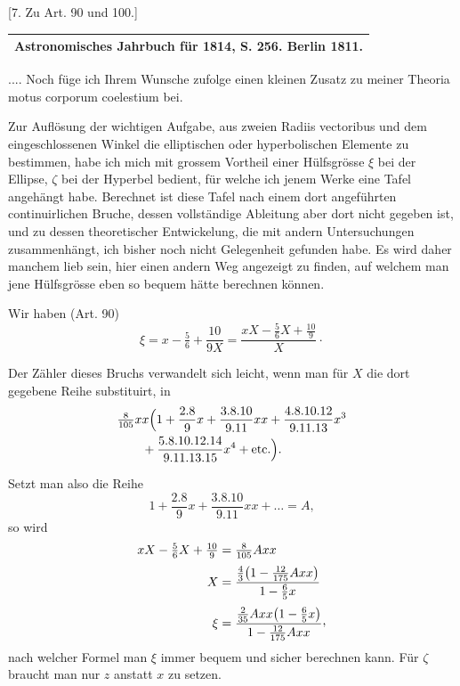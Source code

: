\begin{center}
[7. Zu Art. 90 und 100.]
\end{center}
\begin{center}
\begin{tabular}{c}\hline
\small Astronomisches Jahrbuch für 1814, S. 256. Berlin 1811.\\\hline
\end{tabular}
\end{center}
.... Noch füge ich Ihrem Wunsche zufolge einen kleinen Zusatz zu meiner Theoria motus corporum coelestium bei.

Zur Auflösung der wichtigen Aufgabe, aus zweien Radiis vectoribus und dem eingeschlossenen Winkel die elliptischen oder hyperbolischen Elemente zu bestimmen, habe ich mich mit grossem Vortheil einer Hülfsgrösse \(\xi\) bei der Ellipse, \(\zeta\) bei der Hyperbel bedient, für welche ich jenem Werke eine Tafel angehängt habe. Berechnet ist diese Tafel nach einem dort angeführten continuirlichen Bruche, dessen vollständige Ableitung aber dort nicht gegeben ist, und zu dessen theoretischer Entwickelung, die mit andern Untersuchungen zusammenhängt, ich bisher noch nicht Gelegenheit gefunden habe. Es wird daher manchem lieb sein, hier einen andern Weg angezeigt zu finden, auf welchem man jene Hülfsgrösse eben so bequem hätte berechnen können.

Wir haben (Art. 90)
\[
\xi=x-\tfrac56+\frac{10}{9X}=\frac{xX-\tfrac56X+\tfrac{10}{9}}{X}\mathpunct{\cdot}
\]

Der Zähler dieses Bruchs verwandelt sich leicht, wenn man für \(X\) die dort gegebene Reihe substituirt, in
\[
\begin{aligned}
&\tfrac8{105}xx\Bigl(1+\frac{2.8}{9}x+\frac{3.8.10}{9.11}xx+\frac{4.8.10.12}{9.11.13}x^3\\
&\qquad+\frac{5.8.10.12.14}{9.11.13.15}x^4+\text{etc.}\Bigr).
\end{aligned}
\]

Setzt man also die Reihe
\[
1+\frac{2.8}{9}x+\frac{3.8.10}{9.11}xx+\ldots=A,
\]
so wird
\[
\begin{aligned}
xX-\tfrac56X+\tfrac{10}{9}&=\tfrac8{105}Axx\\[.5ex]
X&=\frac{\tfrac43\bigl(1-\tfrac{12}{175}Axx\bigr)}{1-\tfrac65x}\\[.5ex]
\xi&=\frac{\tfrac2{35}Axx\bigl(1-\tfrac65x\bigr)}{1-\tfrac{12}{175}Axx}\mathpunct{\raisebox{.45ex}{,}}
\end{aligned}
\]
nach welcher Formel man \(\xi\) immer bequem und sicher berechnen kann. Für \(\zeta\) braucht man nur \(z\) anstatt \(x\) zu setzen.

